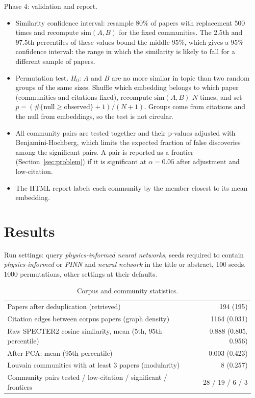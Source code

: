 \documentclass[11pt,a4paper]{article}
\begin{document}
Phase 4: validation and report.
\begin{itemize}
  \item Similarity confidence interval: resample 80\% of papers with replacement 500 times and recompute $\mathrm{sim}(A,B)$ for the fixed communities. The 2.5th and 97.5th percentiles of these values bound the middle 95\%, which gives a 95\% confidence interval: the range in which the similarity is likely to fall for a different sample of papers.
  \item Permutation test. $H_0$: $A$ and $B$ are no more similar in topic than two random groups of the same sizes. Shuffle which embedding belongs to which paper (communities and citations fixed), recompute $\mathrm{sim}(A,B)$ $N$ times, and set $p = (\#\{\text{null} \geq \text{observed}\} + 1)/(N + 1)$. Groups come from citations and the null from embeddings, so the test is not circular.
  \item All community pairs are tested together and their p-values adjusted with Benjamini-Hochberg, which limits the expected fraction of false discoveries among the significant pairs. A pair is reported as a frontier (Section~\ref{sec:problem}) if it is significant at $\alpha = 0.05$ after adjustment and low-citation.
  \item The HTML report labels each community by the member closest to its mean embedding.
\end{itemize}

\section{Results}
\label{sec:results}

Run settings: query \emph{physics-informed neural networks}, seeds required to contain \emph{physics-informed} or \emph{PINN} and \emph{neural network} in the title or abstract, 100 seeds, 1000 permutations, other settings at their defaults.

\begin{table}[h]
\centering
\caption{Corpus and community statistics.}
\label{tab:stats}
\begin{tabular}{lr}
\toprule
Papers after deduplication (retrieved) & 194 (195) \\
Citation edges between corpus papers (graph density) & 1164 (0.031) \\
Raw SPECTER2 cosine similarity, mean (5th, 95th percentile) & 0.888 (0.805, 0.956) \\
After PCA: mean (95th percentile) & 0.003 (0.423) \\
Louvain communities with at least 3 papers (modularity) & 8 (0.257) \\
Community pairs tested / low-citation / significant / frontiers & 28 / 19 / 6 / 3 \\
\bottomrule
\end{tabular}
\end{table}
\end{document}
